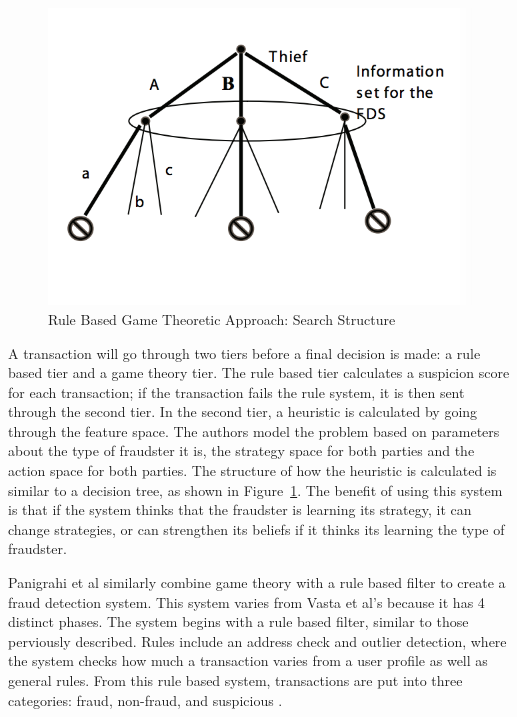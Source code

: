 \documentclass[midd]{thesis}
\begin{document}
\begin{figure} \centering
  \includegraphics[scale=1]{gametheory.png}
  \caption{Rule Based Game Theoretic Approach: Search Structure}
  \label{fig:gametheory1}
\end{figure}

A transaction will go through two tiers before a final decision is made: a rule based tier and a game theory tier. The rule based tier calculates a suspicion score for each transaction; if the transaction fails the rule system, it is then sent through the second tier. In the second tier, a heuristic is calculated by going through the feature space. The authors model the problem based on parameters about the type of fraudster it is, the strategy space for both parties and the action space for both parties. The structure of how the heuristic is calculated is similar to a decision tree, as shown in Figure~\ref{fig:gametheory1}. The benefit of using this system is that if the system thinks that the fraudster is learning its strategy, it can change strategies, or can strengthen its beliefs if it thinks its learning the type of fraudster.    



Panigrahi et al similarly combine game theory with a rule based filter to create a fraud detection system. This system varies from Vasta et al's because it has 4 distinct phases. The system begins with a rule based filter, similar to those perviously described. Rules include an address check and outlier detection, where the system checks how much a transaction varies from a user profile as well as general rules. From this rule based system, transactions are put into three categories: fraud, non-fraud, and suspicious \cite{Panigrahi2009}. 
\end{document}
